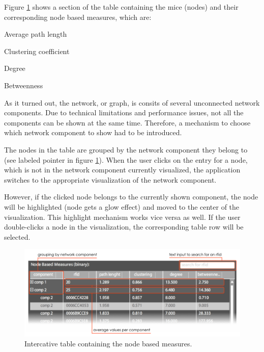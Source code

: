 Figure \ref{fig:node_based_measures} shows a section of the table containing the mice (nodes) and their corresponding node based measures, which are:

\begin{mylist}
\item Average path length
\item Clustering coefficient
\item Degree
\item Betweenness
\end{mylist}

As it turned out, the network, or graph, is consits of several unconnected network components. Due to technical limitations and performance issues, not all the components can be shown at the same time. Therefore, a mechanism to choose which network component to show had to be introduced.

The nodes in the table are grouped by the network component they belong to (see labeled pointer in figure \ref{fig:node_based_measures}). When the user clicks on the entry for a node, which is not in the network component currently visualized, the application switches to the appropriate visualization of the network component.

However, if the clicked node belongs to the currently shown component, the node will be highlighted (node gets a glow effect) and moved to the center of the visualization. This highlight mechanism works vice versa as well. If the user double-clicks a node in the visualization, the corresponding table row will be selected.

\begin{figure}[!htpb]
\begin{center}
  \includegraphics[width=\textwidth]{assets/pdf/node_based_measures.pdf}
  \caption[Node based measures]{Intercative table containing the node based measures.}
  \label{fig:node_based_measures}
\end{center}
\end{figure}

